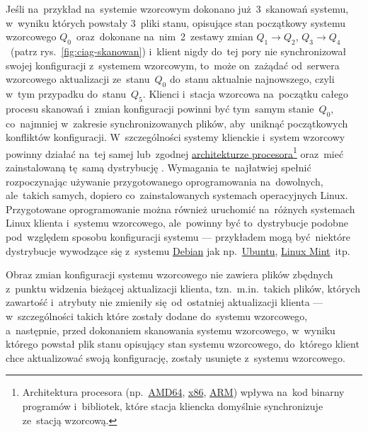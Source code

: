 \documentclass[thesis]{subfiles}
\begin{document}
Jeśli na~przykład na~systemie wzorcowym dokonano już~3~skanowań systemu, w~wyniku których powstały 3~pliki stanu, opisujące stan początkowy systemu wzorcowego $Q_0$~oraz~dokonane na~nim~2~zestawy zmian $Q_1\rightarrow Q_2$, $Q_3\rightarrow Q_4$~(patrz rys.~\ref{fig:ciag-skanowan}) i~klient nigdy do~tej pory nie synchronizował swojej konfiguracji z~systemem wzorcowym, to~może on~zażądać od~serwera wzorcowego aktualizacji ze~stanu~$Q_0$ do~stanu aktualnie najnowszego, czyli w~tym przypadku do~stanu~$Q_5$. Klienci i~stacja wzorcowa na~początku całego procesu skanowań i~zmian konfiguracji powinni być tym~samym stanie~$Q_0$, co~najmniej w~zakresie synchronizowanych plików, aby~uniknąć początkowych konfliktów konfiguracji. W~szczególności systemy klienckie i~system wzorcowy powinny działać na~tej samej lub~zgodnej \href{https://en.wikipedia.org/wiki/List_of_instruction_sets}{architekturze procesora}\footnote{Architektura procesora (np.~\href{https://en.wikipedia.org/wiki/X86-64}{AMD64}, \href{https://en.wikipedia.org/wiki/X86}{x86}, \href{https://en.wikipedia.org/wiki/ARM_architecture}{ARM}) wpływa na~kod binarny programów i~bibliotek, które stacja kliencka domyślnie synchronizuje ze~stacją wzorcową.} oraz~mieć zainstalowaną tę~samą dystrybucję . Wymagania te~najłatwiej spełnić rozpoczynając używanie przygotowanego oprogramowania na~dowolnych, ale~takich samych, dopiero co~zainstalowanych systemach operacyjnych Linux. Przygotowane oprogramowanie można również uruchomić na~różnych systemach Linux klienta i~systemu wzorcowego, ale~powinny być to~dystrybucje podobne pod~względem sposobu konfiguracji systemu --- przykładem mogą być~niektóre dystrybucje wywodzące się z~systemu \href{https://en.wikipedia.org/wiki/Debian}{Debian} jak np.~\href{https://en.wikipedia.org/wiki/Ubuntu_(operating_system)}{Ubuntu}, \href{https://en.wikipedia.org/wiki/Linux_Mint}{Linux Mint}~itp.

Obraz zmian konfiguracji systemu wzorcowego nie zawiera plików zbędnych z~punktu widzenia bieżącej aktualizacji klienta, tzn.~m.in.~takich plików, których zawartość i~atrybuty nie zmieniły się~od~ostatniej aktualizacji klienta --- w~szczególności takich które zostały dodane do~systemu wzorcowego, a~następnie, przed dokonaniem skanowania systemu wzorcowego, w~wyniku którego powstał plik stanu opisujący stan systemu wzorcowego, do~którego klient chce aktualizować swoją konfigurację, zostały usunięte z~systemu wzorcowego.

\end{document}
